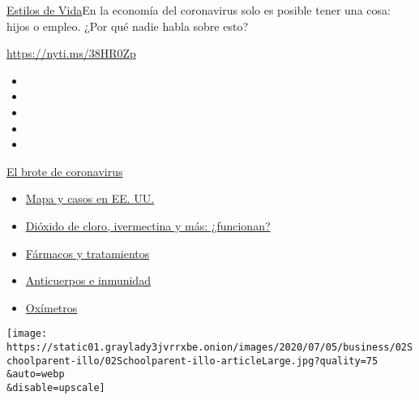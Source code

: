 \href{/es/section/estilos-de-vida}{Estilos de Vida}\textbar{}En la
economía del coronavirus solo es posible tener una cosa: hijos o empleo.
¿Por qué nadie habla sobre esto?

\url{https://nyti.ms/38HR0Zp}

\begin{itemize}
\item
\item
\item
\item
\item
\end{itemize}

\href{https://www.nytimes3xbfgragh.onion/es/spotlight/coronavirus?action=click\&pgtype=Article\&state=default\&region=TOP_BANNER\&context=storylines_menu}{El
brote de coronavirus}

\begin{itemize}
\tightlist
\item
  \href{https://www.nytimes3xbfgragh.onion/es/interactive/2020/espanol/mundo/coronavirus-en-estados-unidos.html?action=click\&pgtype=Article\&state=default\&region=TOP_BANNER\&context=storylines_menu}{Mapa
  y casos en EE. UU.}
\item
  \href{https://www.nytimes3xbfgragh.onion/es/2020/07/23/espanol/america-latina/bolivia-cloro-coronavirus-ivermectina.html?action=click\&pgtype=Article\&state=default\&region=TOP_BANNER\&context=storylines_menu}{Dióxido
  de cloro, ivermectina y más: ¿funcionan?}
\item
  \href{https://www.nytimes3xbfgragh.onion/es/interactive/2020/science/coronavirus-tratamientos-curas.html?action=click\&pgtype=Article\&state=default\&region=TOP_BANNER\&context=storylines_menu}{Fármacos
  y tratamientos}
\item
  \href{https://www.nytimes3xbfgragh.onion/es/2020/07/28/espanol/ciencia-y-tecnologia/anticuerpos-coronavirus-inmunidad.html?action=click\&pgtype=Article\&state=default\&region=TOP_BANNER\&context=storylines_menu}{Anticuerpos
  e inmunidad}
\item
  \href{https://www.nytimes3xbfgragh.onion/es/2020/04/29/espanol/estilos-de-vida/oximetro-para-que-sirve.html?action=click\&pgtype=Article\&state=default\&region=TOP_BANNER\&context=storylines_menu}{Oxímetros}
\end{itemize}

\texttt{[image: https://static01.graylady3jvrrxbe.onion/images/2020/07/05/business/02Schoolparent-illo/02Schoolparent-illo-articleLarge.jpg?quality=75\\\&auto=webp\\\&disable=upscale]}

